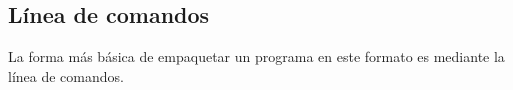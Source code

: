 \subsection{Línea de comandos}
  La forma más básica de empaquetar un programa en este formato es mediante la línea de comandos.
  